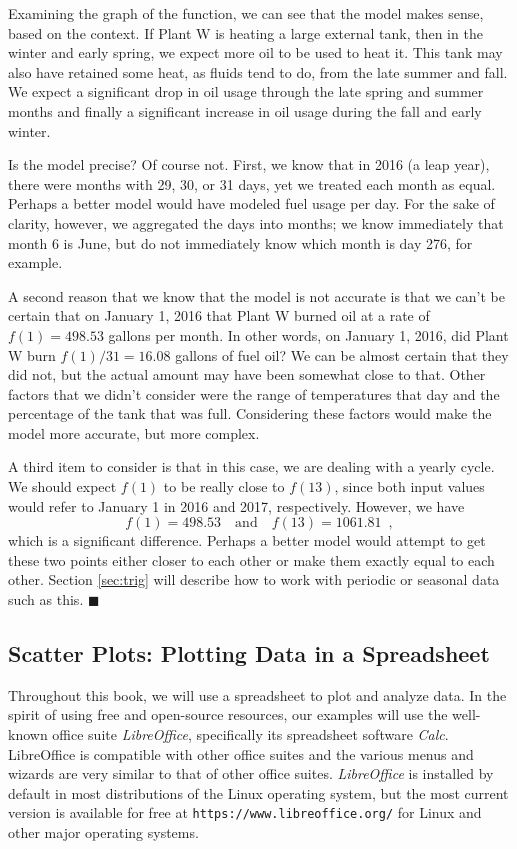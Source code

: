 Examining the graph of the function, we can see that the model makes sense, based on the context. If Plant W is heating a large external tank, then in the winter and early spring, we expect more oil to be used to heat it. This tank may also have retained some heat, as fluids tend to do, from the late summer and fall. We expect a significant drop in oil usage through the late spring and summer months and finally a significant increase in oil usage during the fall and early winter.

Is the model precise? Of course not. First, we know that in 2016 (a leap year), there were months with 29, 30, or 31 days, yet we treated each month as equal. Perhaps a better model would have modeled fuel usage per day. For the sake of clarity, however, we aggregated the days into months; we know immediately that month 6 is June, but do not immediately know which month is day 276, for example.

A second reason that we know that the model is not accurate is that we can't be certain that on January 1, 2016 that Plant W burned oil at a rate of $f(1) = 498.53$ gallons per month. In other words, on January 1, 2016, did Plant W burn $f(1)/31 = 16.08$ gallons of fuel oil? We can be almost certain that they did not, but the actual amount may have been somewhat close to that. Other factors that we didn't consider were the range of temperatures that day and the percentage of the tank that was full. Considering these factors would make the model more accurate, but more complex.

A third item to consider is that in this case, we are dealing with a yearly cycle. We should expect $f(1)$ to be really close to $f(13)$, since both input values would refer to January 1 in 2016 and 2017, respectively. However, we have
$$ f(1) = 498.53 \quad \mbox{and} \quad f(13) = 1061.81 \enspace ,$$
which is a significant difference. Perhaps a better model would attempt to get these two points either closer to each other or make them exactly equal to each other. Section \ref{sec:trig} will describe how to work with periodic or seasonal data such as this. \hfill$\blacksquare$

\subsection{Scatter Plots: Plotting Data in a Spreadsheet}
\label{ssec:plot-data}
Throughout this book, we will use a spreadsheet to plot and analyze data. In the spirit of using free and open-source resources, our examples will use the well-known office suite {\em LibreOffice}, specifically its spreadsheet software {\em Calc}. LibreOffice is compatible with other office suites and the various menus and wizards are very similar to that of other office suites. {\em LibreOffice} is installed by default in most distributions of the Linux operating system, but the most current version is available for free at {\tt https://www.libreoffice.org/} for Linux and other major operating systems.

